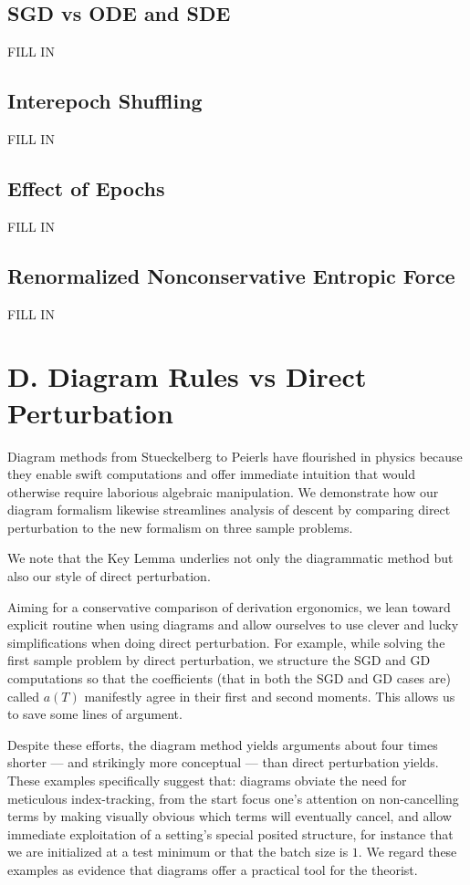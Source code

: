 \documentclass{article}
\begin{document}
    \subsection*{SGD vs ODE and SDE}
        {\color{moor} FILL IN}
    \subsection*{Interepoch Shuffling}
        {\color{moor} FILL IN}
    \subsection*{Effect of Epochs}
        {\color{moor} FILL IN}
    \subsection*{Renormalized Nonconservative Entropic Force}
        {\color{moor} FILL IN}

\section*{D. Diagram Rules vs Direct Perturbation} \label{sect:compare}
    Diagram methods from Stueckelberg to Peierls have flourished in physics
    because they enable swift computations and offer immediate intuition that
    would otherwise require laborious algebraic manipulation.  We demonstrate
    how our diagram formalism likewise streamlines analysis of descent by
    comparing direct perturbation to the new formalism on three sample
    problems.

    We note that the Key Lemma underlies not only the diagrammatic method but
    also our style of direct perturbation.

    Aiming for a conservative comparison of derivation ergonomics, we lean
    toward explicit routine when using diagrams and allow ourselves to use
    clever and lucky simplifications when doing direct perturbation.  For
    example, while solving the first sample problem by direct perturbation,
    we structure the SGD and GD computations so that the coefficients (that in
    both the SGD and GD cases are) called $a(T)$ manifestly agree in their
    first and second moments.  This allows us to save some lines of argument.

    Despite these efforts, the diagram method yields arguments about four times
    shorter --- and strikingly more conceptual --- than direct perturbation
    yields.  These examples specifically suggest that: diagrams obviate the
    need for meticulous index-tracking, from the start focus one's attention on
    non-cancelling terms by making visually obvious which terms will eventually
    cancel, and allow immediate exploitation of a setting's special posited
    structure, for instance that we are initialized at a test minimum or that
    the batch size is $1$.  We regard these examples as evidence that diagrams
    offer a practical tool for the theorist.
\end{document}
